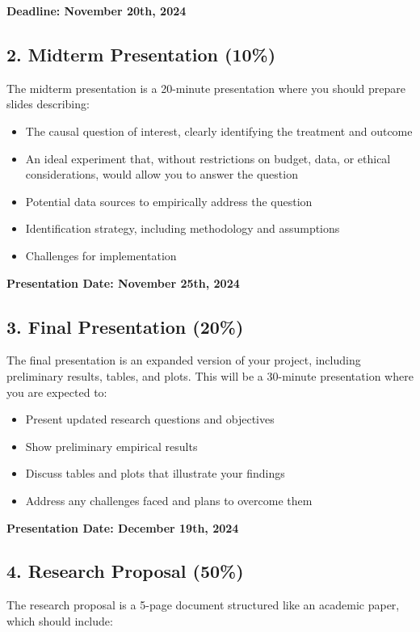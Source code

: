 \documentclass[12pt]{article}
\begin{document}
\textbf{Deadline: November 20th, 2024}

\subsection*{2. Midterm Presentation (10\%)}
The midterm presentation is a 20-minute presentation where you should prepare slides describing:

\begin{itemize}
    \item The causal question of interest, clearly identifying the treatment and outcome
    \item An ideal experiment that, without restrictions on budget, data, or ethical considerations, would allow you to answer the question
    \item Potential data sources to empirically address the question
    \item Identification strategy, including methodology and assumptions
    \item Challenges for implementation
\end{itemize}

\textbf{Presentation Date: November 25th, 2024}

\subsection*{3. Final Presentation (20\%)}
The final presentation is an expanded version of your project, including preliminary results, tables, and plots. This will be a 30-minute presentation where you are expected to:

\begin{itemize}
    \item Present updated research questions and objectives
    \item Show preliminary empirical results
    \item Discuss tables and plots that illustrate your findings
    \item Address any challenges faced and plans to overcome them
\end{itemize}

\textbf{Presentation Date: December 19th, 2024}

\subsection*{4. Research Proposal (50\%)}
The research proposal is a 5-page document structured like an academic paper, which should include:
\end{document}
